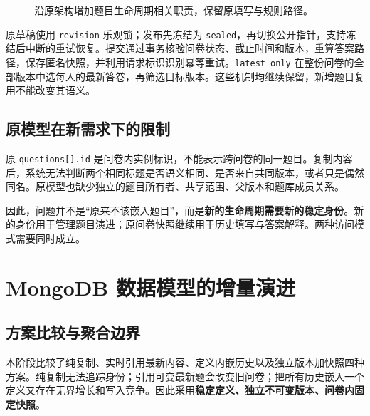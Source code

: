 \documentclass[UTF8,10pt,a4paper,twocolumn,fontset=none]{ctexart}
\newcommand{\term}[1]{\textbf{#1}}
\begin{document}
\begin{figure}[t]
\centering
{}
\caption{沿原架构增加题目生命周期相关职责，保留原填写与规则路径。}
\label{fig:architecture}
\end{figure}

原草稿使用 \texttt{revision} 乐观锁；发布先冻结为 \texttt{sealed}，再切换公开指针，支持冻结后中断的重试恢复。提交通过事务核验问卷状态、截止时间和版本，重算答案路径，保存匿名快照，并利用请求标识识别幂等重试。\texttt{latest\_only} 在整份问卷的全部版本中选每人的最新答卷，再筛选目标版本。这些机制均继续保留，新增题目复用不能改变其语义。

\subsection{原模型在新需求下的限制}
原 \texttt{questions[].id} 是问卷内实例标识，不能表示跨问卷的同一题目。复制内容后，系统无法判断两个相同标题是否语义相同、是否来自共同版本，或者只是偶然同名。原模型也缺少独立的题目所有者、共享范围、父版本和题库成员关系。

因此，问题并不是“原来不该嵌入题目”，而是\term{新的生命周期需要新的稳定身份}。新的身份用于管理题目演进；原问卷快照继续用于历史填写与答案解释。两种访问模式需要同时成立。

\section{MongoDB 数据模型的增量演进}
\subsection{方案比较与聚合边界}
本阶段比较了纯复制、实时引用最新内容、定义内嵌历史以及独立版本加快照四种方案。纯复制无法追踪身份；引用可变最新题会改变旧问卷；把所有历史嵌入一个定义又存在无界增长和写入竞争。因此采用\term{稳定定义、独立不可变版本、问卷内固定快照}。
\end{document}
